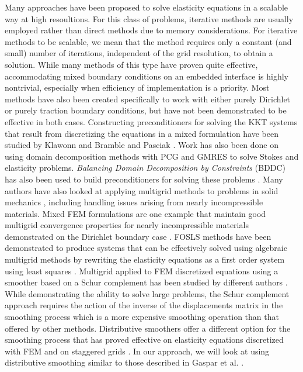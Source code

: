 Many approaches have been proposed to solve elasticity equations in a scalable way at high resoultions. For this class of problems, iterative methods are usually employed rather than direct methods due to memory considerations. For iterative methods to be scalable, we mean that the method requires only a constant (and small) number of iterations, independent of the grid resolution, to obtain a solution. While many methods of this type have proven quite effective, accommodating mixed boundary conditions on an embedded interface is highly nontrivial, especially when efficiency of implementation is a priority. Most methods have also been created specifically to work with either purely Dirichlet or purely traction boundary conditions, but have not been demonstrated to be effective in both cases. Constructing preconditioners for solving the KKT systems that result from discretizing the equations in a mixed formulation have been studied by Klawonn \cite{Klawonn95, Klawonn98.1} and Bramble and Pasciak \cite{Bramble88}. Work has also been done on using domain decomposition methods with PCG \cite{Farhat00} and GMRES \cite{Klawonn98.2} to solve Stokes and elasticity problems. \emph{Balancing Domain Decomposition by Constraints} (BDDC) has also been used to build preconditioners for solving these problems \cite{Dohrmann03, Pavarino10}. Many authors have also looked at applying multigrid methods to problems in solid mechanics \cite{Verfurth84, Kocvara87, Haung90, Brenner93, Cai.Zhiqiang98, Axelsson99, Hiptmair99, Schoberl99, Wieners00, Heys04, Gaspar08, Lee.Young-Ju09, Zhu.Yongning10}, including handling issues arising from nearly incompressible materials. Mixed FEM formulations are one example that maintain good multigrid convergence properties for nearly incompressible materials demonstrated on the Dirichlet boundary case \cite{Brenner93, Schoberl99, Lee.Young-Ju09}. FOSLS methods have been demonstrated to produce systems that can be effectively solved using algebraic multigrid methods by rewriting the elasticity equations as a first order system using least squares \cite{Cai.Zhiqiang98, Heys04}. Multigrid applied to FEM discretized equations using a smoother based on a Schur complement has been studied by different authors \cite{Axelsson99, Wieners00}. While demonstrating the ability to solve large problems, the Schur complement approach requires the action of the inverse of the displacements matrix in the smoothing process which is a more expensive smoothing operation than that offered by other methods. Distributive smoothers offer a different option for the smoothing process that has proved effective on elasticity equations discretized with FEM \cite{Hiptmair99} and on staggered grids \cite{Gaspar08}. In our approach, we will look at using distributive smoothing similar to those described in Gaspar et al. \cite{Gaspar08}.

